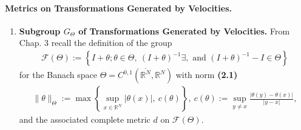 \documentclass{book}
\numberwithin{equation}{section}
\begin{document}
\paragraph{Metrics on Transformations Generated by Velocities.}
\begin{enumerate}
    \item \textbf{Subgroup $G_\Theta$ of Transformations Generated by Velocities.} From Chap. 3 recall the definition of the group
    \begin{align*}
        \mathcal{F}(\Theta) := \left\{I + \theta;\theta\in\Theta,\ (I + \theta)^{-1}\exists, \mbox{ and } (I + \theta)^{-1} - I\in\Theta\right\}
    \end{align*}
    for the Banach space $\Theta = C^{0,1}(\overline{\mathbb{R}^N},\mathbb{R}^N)$ with norm \textbf{(2.1)}
    \begin{align*}
        \|\theta\|_\Theta := \max\left\{\sup_{x\in\mathbb{R}^N} |\theta(x)|,\ c(\theta)\right\},\ c(\theta) := \sup_{y\ne x} \frac{|\theta(y) - \theta(x)|}{|y - x|},
    \end{align*}
    and the associated complete metric $d$ on $\mathcal{F}(\Theta)$.
    

\end{enumerate}
\end{document}
